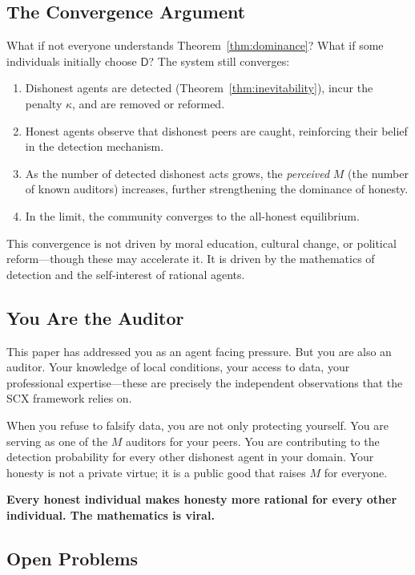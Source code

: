 \documentclass[11pt,a4paper]{article}
\theoremstyle{definition}
\theoremstyle{remark}
\newcommand{\SCX}{\textsc{SCX}}
\newcommand{\dishonest}{\mathsf{D}}
\newcommand{\cost}{\kappa}
\begin{document}
\subsection{The Convergence Argument }

What if not everyone understands Theorem~\ref{thm:dominance}? What if some individuals initially choose $\dishonest$? The system still converges:

\begin{enumerate}[label=(\roman*)]
    \item Dishonest agents are detected (Theorem~\ref{thm:inevitability}), incur the penalty $\cost$, and are removed or reformed.
    \item Honest agents observe that dishonest peers are caught, reinforcing their belief in the detection mechanism.
    \item As the number of detected dishonest acts grows, the \emph{perceived} $M$ (the number of known auditors) increases, further strengthening the dominance of honesty.
    \item In the limit, the community converges to the all-honest equilibrium.
\end{enumerate}

This convergence is not driven by moral education, cultural change, or political reform---though these may accelerate it. It is driven by the mathematics of detection and the self-interest of rational agents.

\subsection{You Are the Auditor }

This paper has addressed you as an agent facing pressure. But you are also an auditor. Your knowledge of local conditions, your access to data, your professional expertise---these are precisely the independent observations that the \SCX{} framework relies on.

When you refuse to falsify data, you are not only protecting yourself. You are serving as one of the $M$ auditors for your peers. You are contributing to the detection probability for every other dishonest agent in your domain. Your honesty is not a private virtue; it is a public good that raises $M$ for everyone.

\textbf{Every honest individual makes honesty more rational for every other individual. The mathematics is viral.}

\subsection{Open Problems }
\end{document}
